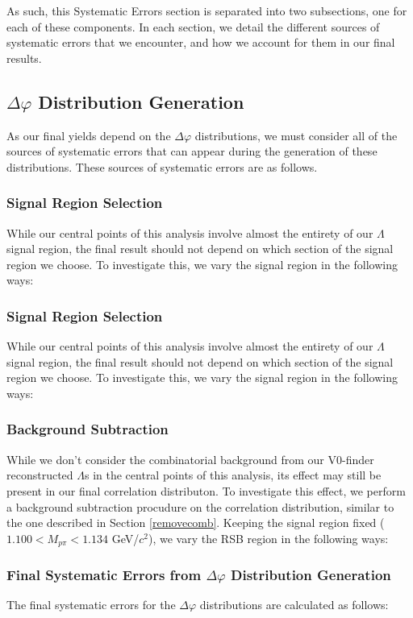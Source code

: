 \documentclass[ALICE,manyauthors]{ALICE_analysis_notes}
\begin{document}
As such, this Systematic Errors section is separated into two subsections, one for each of these components. In each section, we detail the different sources of systematic errors that we encounter, and how we account for them in our final results.


\subsection{$\Delta\varphi$ Distribution Generation}
As our final yields depend on the $\Delta\varphi$ distributions, we must consider all of the sources of systematic errors that can appear during the generation of these distributions. These sources of systematic errors are as follows.

\subsubsection{Signal Region Selection}
While our central points of this analysis involve almost the entirety of our $\Lambda$ signal region, the final result should not depend on which section of the signal region we choose. To investigate this, we vary the signal region in the following ways:

\subsubsection{Signal Region Selection}
While our central points of this analysis involve almost the entirety of our $\Lambda$ signal region, the final result should not depend on which section of the signal region we choose. To investigate this, we vary the signal region in the following ways:

\subsubsection{Background Subtraction}
While we don't consider the combinatorial background from our V0-finder reconstructed $\Lambda$s in the central points of this analysis, its effect may still be present in our final correlation distributon. To investigate this effect, we perform a background subtraction procudure on the correlation distribution, similar to the one described in Section \ref{removecomb}. Keeping the signal region fixed ($1.100 < M_{p\pi} < 1.134$ GeV/$c^2$), we vary the RSB region in the following ways:

\subsubsection{Final Systematic Errors from $\Delta\varphi$ Distribution Generation}
The final systematic errors for the $\Delta\varphi$ distributions are calculated as follows:
\end{document}
